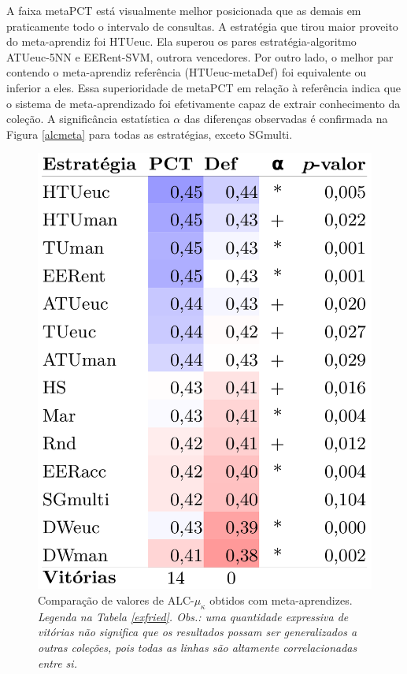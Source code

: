 A faixa metaPCT está visualmente melhor posicionada que as demais em praticamente todo o intervalo de consultas.
A estratégia que tirou maior proveito do meta-aprendiz foi HTUeuc.
Ela superou os pares estratégia-algoritmo ATUeuc-5NN e EERent-SVM, outrora vencedores.
Por outro lado, o melhor par contendo o meta-aprendiz referência (HTUeuc-metaDef) foi equivalente ou inferior a eles.
Essa superioridade de metaPCT em relação à referência indica que o sistema de meta-aprendizado foi efetivamente capaz de extrair conhecimento da coleção.
A significância estatística $\alpha$ das diferenças observadas é confirmada na Figura \ref{alcmeta} para todas as estratégias, exceto SGmulti.
\begin{figure}
\centering
\includegraphics[scale=0.4]{images/metaalc.pdf}
\caption[Comparação de valores de ALC-$\mu_{\kappa}$ obtidos com meta-aprendizes.]{Comparação de valores de ALC-$\mu_{\kappa}$ obtidos com meta-aprendizes.
\textit{Legenda na Tabela \ref{exfried}. Obs.: uma quantidade expressiva de vitórias não significa que os resultados possam ser generalizados a outras coleções, pois todas as linhas são altamente correlacionadas entre si.}}

\end{figure}
